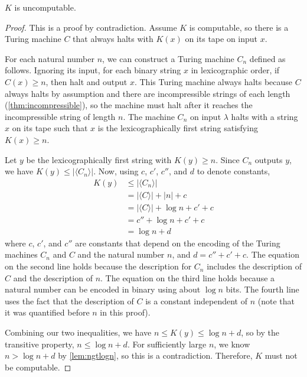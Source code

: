 \begin{theorem}
  $K$ is uncomputable.
\end{theorem}
\begin{proof}
  This is a proof by contradiction.
  Assume $K$ is computable, so there is a Turing machine $C$ that always halts with $K(x)$ on its tape on input $x$.

  For each natural number $n$, we can construct a Turing machine $C_n$ defined as follows.
  Ignoring its input, for each binary string $x$ in lexicographic order, if $C(x) \geq n$, then halt and output $x$.
  This Turing machine always halts because $C$ always halts by assumption and there are incompressible strings of each length (\autoref{thm:incompressible}), so the machine must halt after it reaches the incompressible string of length $n$.
  The machine $C_n$ on input $\lambda$ halts with a string $x$ on its tape such that $x$ is the lexicographically first string satisfying $K(x) \geq n$.

  Let $y$ be the lexicographically first string with $K(y) \geq n$.
  Since $C_n$ outputs $y$, we have $K(y) \leq |\langle C_n \rangle|$.
  Now, using $c$, $c'$, $c''$, and $d$ to denote constants,
  \begin{align*}
  K(y) & \leq |\langle C_n \rangle| \\
       & = |\langle C \rangle| + |n| + c \\
       & = |\langle C \rangle| + \log n + c' + c \\
       & = c'' + \log n + c' + c \\
       & = \log n + d
  \end{align*}
  where $c$, $c'$, and $c''$ are constants that depend on the encoding of the Turing machines $C_n$ and $C$ and the natural number $n$, and $d = c'' + c' + c$.
  The equation on the second line holds because the description for $C_n$ includes the description of $C$ and the description of $n$.
  The equation on the third line holds because a natural number can be encoded in binary using about $\log n$ bits.
  The fourth line uses the fact that the description of $C$ is a constant independent of $n$ (note that it was quantified before $n$ in this proof).

  Combining our two inequalities, we have $n \leq K(y) \leq \log n + d$, so by the transitive property, $n \leq \log n + d$.
  For sufficiently large $n$, we know $n > \log n + d$ by \autoref{lem:ngtlogn}, so this is a contradiction.
  Therefore, $K$ must not be computable.
\end{proof}

